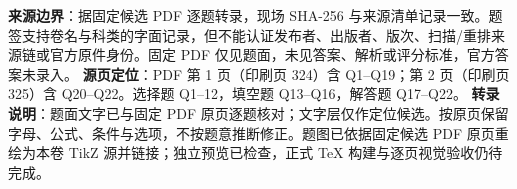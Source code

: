 

\begin{gktip}
\textbf{来源边界}：据固定候选 PDF 逐题转录，现场 SHA-256 与来源清单记录一致。题签支持卷名与科类的字面记录，但不能认证发布者、出版者、版次、扫描/重排来源链或官方原件身份。固定 PDF 仅见题面，未见答案、解析或评分标准，官方答案未录入。
\textbf{源页定位}：PDF 第 1 页（印刷页 324）含 Q1–Q19；第 2 页（印刷页 325）含 Q20–Q22。选择题 Q1–12，填空题 Q13–Q16，解答题 Q17–Q22。
\textbf{转录说明}：题面文字已与固定 PDF 原页逐题核对；文字层仅作定位候选。按原页保留字母、公式、条件与选项，不按题意推断修正。题图已依据固定候选 PDF 原页重绘为本卷 TikZ 源并链接；独立预览已检查，正式 TeX 构建与逐页视觉验收仍待完成。
\end{gktip}



